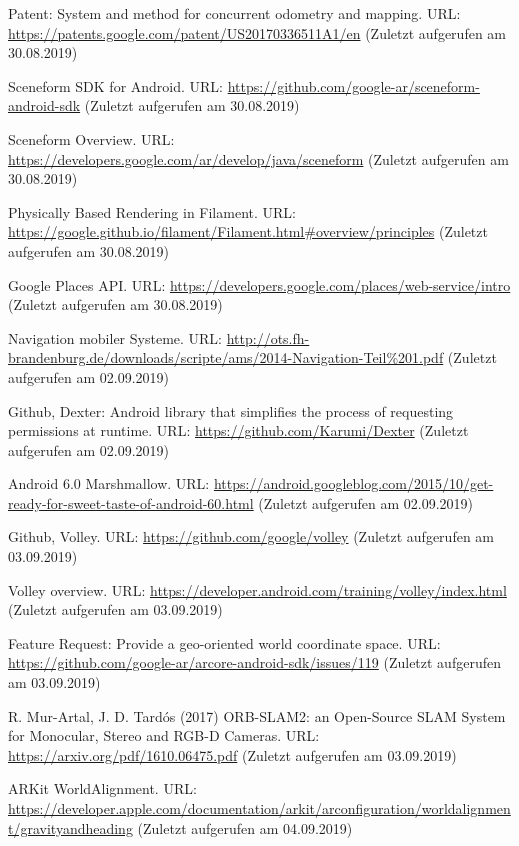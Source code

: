 \documentclass[12pt,oneside]{scrreprt}
\begin{document}
\begin{thebibliography}{10}
 Patent: System and method for concurrent odometry and mapping. URL: \url{https://patents.google.com/patent/US20170336511A1/en} (Zuletzt aufgerufen am 30.08.2019)

 Sceneform SDK for Android. URL: \url{https://github.com/google-ar/sceneform-android-sdk} (Zuletzt aufgerufen am 30.08.2019)

 Sceneform Overview. URL: \url{https://developers.google.com/ar/develop/java/sceneform} (Zuletzt aufgerufen am 30.08.2019)

 Physically Based Rendering in Filament. URL: \url{https://google.github.io/filament/Filament.html#overview/principles} (Zuletzt aufgerufen am 30.08.2019)

 Google Places API. URL: \url{https://developers.google.com/places/web-service/intro} (Zuletzt aufgerufen am 30.08.2019)

 Navigation mobiler Systeme. URL: \url{http://ots.fh-brandenburg.de/downloads/scripte/ams/2014-Navigation-Teil\%201.pdf} (Zuletzt aufgerufen am 02.09.2019)

 Github, Dexter: Android library that simplifies the process of requesting permissions at runtime. URL: \url{https://github.com/Karumi/Dexter} (Zuletzt aufgerufen am 02.09.2019)

 Android 6.0 Marshmallow. URL: \url{https://android.googleblog.com/2015/10/get-ready-for-sweet-taste-of-android-60.html}  (Zuletzt aufgerufen am 02.09.2019)

 Github, Volley. URL: \url{https://github.com/google/volley} (Zuletzt aufgerufen am 03.09.2019)

 Volley overview. URL: \url{https://developer.android.com/training/volley/index.html} (Zuletzt aufgerufen am 03.09.2019)

 Feature Request: Provide a geo-oriented world coordinate space. URL: \url{https://github.com/google-ar/arcore-android-sdk/issues/119} (Zuletzt aufgerufen am 03.09.2019)

 R. Mur-Artal, J. D. Tardós (2017) ORB-SLAM2: an Open-Source SLAM System for Monocular, Stereo and RGB-D Cameras. URL: \url{https://arxiv.org/pdf/1610.06475.pdf} (Zuletzt aufgerufen am 03.09.2019)

 ARKit WorldAlignment. URL: \url{https://developer.apple.com/documentation/arkit/arconfiguration/worldalignment/gravityandheading} (Zuletzt aufgerufen am 04.09.2019)


\end{thebibliography}
\end{document}
